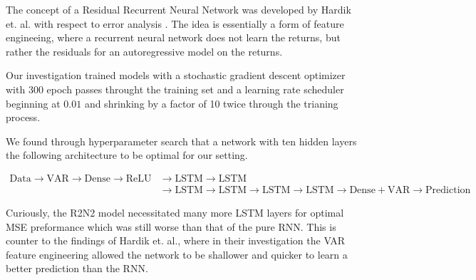 The concept of a Residual Recurrent Neural Network was developed by Hardik et. al. with respect to error analysis \cite{r2n2}. The idea is essentially a form of feature engineeing, where a recurrent neural network does not learn the returns, but rather the residuals for an autoregressive model on the returns. 

Our investigation trained models with a stochastic gradient descent optimizer with 300 epoch passes throught the training set and a learning rate scheduler beginning at $0.01$ and shrinking by a factor of 10 twice through the trianing process.

We found through hyperparameter search that a network with ten hidden layers the following architecture to be optimal for our setting.

\begin{align*}
\mathrm{Data}
 \rightarrow  \mathrm{VAR} 
\rightarrow \mathrm{Dense}
\rightarrow \mathrm{ReLU} &
\rightarrow \mathrm{LSTM}
\rightarrow \mathrm{LSTM} \\
&\rightarrow \mathrm{LSTM}
\rightarrow \mathrm{LSTM}
\rightarrow \mathrm{LSTM}
\rightarrow \mathrm{LSTM}
\rightarrow\mathrm{Dense} + \mathrm{VAR} 
\rightarrow \mathrm{Prediction}
\end{align*}

Curiously, the R2N2 model necessitated many more LSTM layers for optimal MSE preformance which was still worse than that of the pure RNN. This is counter to the findings of Hardik et. al., where in their investigation the VAR feature engineering allowed the network to be shallower and quicker to learn a better prediction than the RNN. 